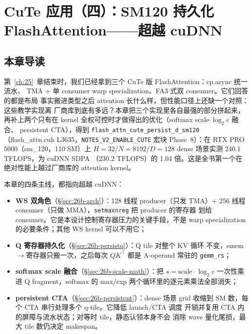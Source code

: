 \chapter{CuTe 应用（四）：SM120 持久化 FlashAttention——超越 cuDNN}\label{ch:26b}

\section{本章导读}

第~\ref{ch:25}~章结束时，我们已经拿到三个 CuTe 版 FlashAttention：cp.async 统一流水、
TMA + 单 consumer warp specialization、FA3 式双 consumer。它们回答的都是布局
事实搬进类型之后 attention 长什么样，但性能口径上还缺一个对照：这些教学实现离
厂商库到底有多远？本章把三个实现里各自最强的部分拼起来，再补上两个只有在
kernel 全权可控时才做得出的优化（softmax scale$\cdot\log_2 e$ 融合、
persistent CTA），得到
\texttt{flash\_\allowbreak{}attn\_\allowbreak{}cute\_\allowbreak{}persist\_\allowbreak{}d\_\allowbreak{}sm120}
（flash\_attn.cuh L3635，\texttt{NOTES\_\allowbreak{}V2\_\allowbreak{}ENABLE\_\allowbreak{}CUTE}
宏块 Phase~8）：在 RTX PRO 5000（sm\_120，110 SM）上
$H{=}32$/$N{=}8192$/$D{=}128$ dense 场景实测 240.1 TFLOPS，为 cuDNN SDPA
（230.2 TFLOPS）的 1.04 倍。这是全书第一个在绝对性能上越过厂商库的
attention kernel。

本章的四条主线，都指向超越 cuDNN：

\begin{itemize}[itemsep=1pt,topsep=2pt]
  \item \textbf{WS 双角色}（\S\ref{sec:26b-arch}）：128 线程 producer（只发 TMA）+
        256 线程 consumer（只做 MMA），\texttt{setmaxnreg} 把 producer 的寄存器
        划给 consumer。它是本设计控制寄存器压力的关键手段，不是
        warp specialization 的必要条件；其他 WS kernel 可以不用它；
  \item \textbf{Q 寄存器持久化}（\S\ref{sec:26b-persistq}）：Q tile 对整个 KV 循环
        不变，smem$\to$寄存器只搬一次，之后每次 $QK^\top$ 都是 A-operand 常驻的
        \texttt{gemm\_rs}；
  \item \textbf{softmax scale 融合}（\S\ref{sec:26b-scale-math}）：把
        $s=\text{scale}\cdot\log_2 e$ 一次性乘进 Q fragment，softmax 的 max/exp
        两个循环里的逐元素乘法全部消失；
  \item \textbf{persistent CTA}（\S\ref{sec:26b-persistent}）：dense 场景 grid
        收缩到 SM 数，每个 CTA 串行处理多个 q-tile。它降低 launch/CTA 调度
        开销并复用 CTA 内的屏障与流水状态；对等时 tile，静态认领本身不会
        消除 wave 量化尾损，最大 tile 数仍决定 makespan。
\end{itemize}

